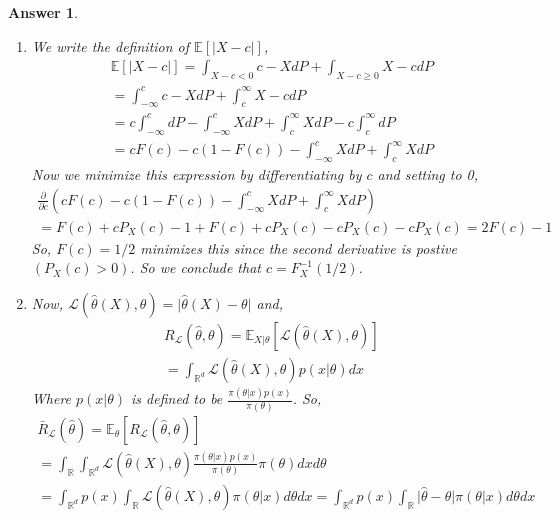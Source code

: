\documentclass[12pt]{article}
\theoremstyle{colon}
\newtheorem*{answer}{Answer}
\begin{document}
\begin{answer}
  \leavevmode
  \begin{enumerate}[label=\arabic*)]
    \item We write the definition of $\mathbb{E}[\lvert X - c \rvert]$,
      \begin{gather*}
        \mathbb{E}[\lvert X - c \rvert] = \int_{X-c < 0} c - X dP + \int_{X-c \geq 0} X - c dP \\
        = \int_{-\infty}^c  c - X dP + \int_c^\infty X - c dP \\
        = c \int_{-\infty}^c dP - \int_{-\infty}^c X dP + \int_c^\infty X dP - c \int_c^\infty dP \\
        = c F(c) - c(1 - F(c)) - \int_{-\infty}^c X dP + \int_c^\infty X dP
      \end{gather*}
      Now we minimize this expression by differentiating by $c$ and setting to 0,
      \begin{gather*}
        \frac{\partial}{\partial c} \left( c F(c) - c(1 - F(c)) - \int_{-\infty}^c X dP + \int_c^\infty X dP \right) \\
        = F(c) + c P_X(c) -1 + F(c) + cP_X(c) - cP_X(c) - cP_X(c) = 2F(c) - 1
      \end{gather*}
      So, $F(c) = 1/2$ minimizes this since the second derivative is postive $(P_X(c) > 0)$. So we conclude that $c = F_X^{-1}(1/2)$.
    \item Now, $\mathcal{L}(\widehat{\theta}(X), \theta) = \lvert \widehat{\theta}(X) - \theta \rvert$ and,
      \begin{gather*}
        R_\mathcal{L}(\widehat{\theta}, \theta) = \mathbb{E}_{X|\theta}[\mathcal{L}(\widehat{\theta}(X),\theta)] \\
        = \int_{\mathbb{R}^d} \mathcal{L}(\widehat{\theta}(X), \theta) p(x | \theta) dx
      \end{gather*}
      Where $p(x | \theta)$ is defined to be $\frac{\pi(\theta|x)p(x)}{\pi(\theta)}$. So,
      \begin{gather*}
        \bar{R}_\mathcal{L}(\widehat{\theta}) = \mathbb{E}_\theta [R_\mathcal{L}(\widehat{\theta}, \theta)] \\
        = \int_\mathbb{R} \int_{\mathbb{R}^d} \mathcal{L}(\widehat{\theta}(X), \theta) \frac{\pi(\theta|x)p(x)}{\pi(\theta)} \pi(\theta) dx d\theta \\
        = \int_{\mathbb{R}^d} p(x) \int_\mathbb{R} \mathcal{L}(\widehat{\theta}(X), \theta) \pi(\theta|x) d\theta dx
        = \int_{\mathbb{R}^d} p(x) \int_\mathbb{R} \lvert \widehat{\theta} - \theta \rvert \pi(\theta|x) d\theta dx

\end{gather*}
\end{enumerate}
\end{answer}
\end{document}

